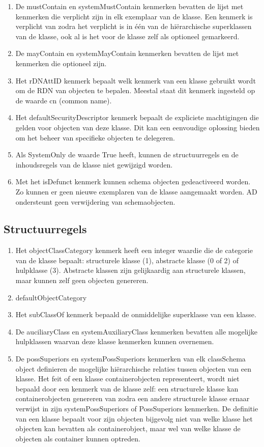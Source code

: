 \begin{enumerate}
	\item De mustContain en systemMustContain kenmerken bevatten de lijst
		met kenmerken die verplicht zijn in elk exemplaar van de klasse.
		Een kenmerk is verplicht van zodra het verplicht is in één van
		de hiërarchische superklassen van de klasse, ook al is het voor
		de klasse zelf als optioneel gemarkeerd.
	\item De mayContain en systemMayContain kenmerken bevatten de lijst met
		kenmerken die optioneel zijn.
	\item Het rDNAttID kenmerk bepaalt welk kenmerk van een klasse gebruikt
		wordt om de RDN van objecten te bepalen. Meestal staat dit
		kenmerk ingesteld op de waarde cn (common name).
	\item Het defaultSecurityDescriptor kenmerk bepaalt de expliciete
		machtigingen die gelden voor objecten van deze klasse. Dit kan
		een eenvoudige oplossing bieden om het beheer van specifieke
		objecten te delegeren.
	\item Als SystemOnly de waarde True heeft, kunnen de structuurregels en
		de inhoudsregels van de klasse niet gewijzigd worden.
	\item Met het isDefunct kenmerk kunnen schema objecten gedeactiveerd
		worden. Zo kunnen er geen nieuwe exemplaren van de klasse
		aangemaakt worden. AD ondersteunt geen verwijdering van
		schemaobjecten.
\end{enumerate}

\subsection{Structuurregels}
\begin{enumerate}
	\item Het objectClassCategory kenmerk heeft een integer waardie die de
		categorie van de klasse bepaalt: structurele klasse (1),
		abstracte klasse (0 of 2) of hulpklasse (3). Abstracte klassen
		zijn gelijkaardig aan structurele klassen, maar kunnen zelf geen
		objecten genereren.
	\item defaultObjectCategory
	\item Het subClassOf kenmerk bepaald de onmiddelijke superklasse van een
		klasse.
	\item De auciliaryClass en systemAuxiliaryClass kenmerken bevatten alle
		mogelijke hulpklassen waarvan deze klasse kenmerken kunnen
		overnemen.
	\item De possSuperiors en systemPossSuperiors kenmerken van elk
		classSchema object definieren de mogelijke hiërarchische
		relaties tussen objecten van een klasse. Het feit of een klasse
		containerobjecten representeert, wordt niet bepaald door een
		kenmerk van de klasse zelf: een structurele klasse kan
		containerobjecten genereren van zodra een andere structurele
		klasse ernaar verwijst in zijn systemPossSuperiors of
		PossSuperiors kenmerken. De definitie van een klasse bepaalt
		voor zijn objecten bijgevolg niet van welke klasse het objecten
		kan bevatten als containerobject, maar wel van welke klasse de
		objecten als container kunnen optreden.
\end{enumerate}

